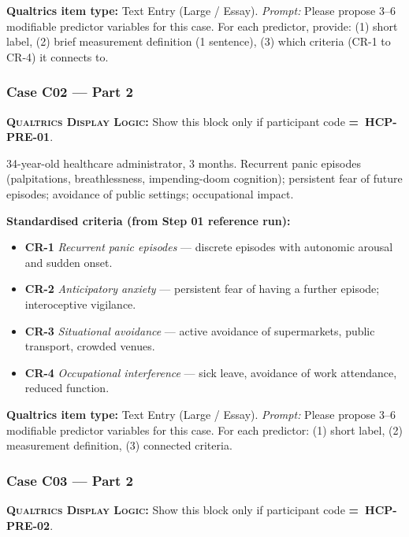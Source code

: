 \documentclass[11pt,a4paper]{article}
\newcommand{\responsetextarea}[1]{\begin{tcolorbox}[colback=ResponseBG,colframe=GoldAmber,boxrule=0.6pt,arc=1.5mm,left=6pt,right=6pt,top=5pt,bottom=5pt]\small\textbf{\color{GoldAmber}Qualtrics item type:} Text Entry (Large / Essay). \quad \textit{Prompt:} #1\end{tcolorbox}}
\newcommand{\dlnote}[1]{\par\vspace{0.15em}\noindent\begin{tcolorbox}[colback=AccentAmber,colframe=GoldAmber,boxrule=0.45pt,arc=1mm,left=5pt,right=5pt,top=2.5pt,bottom=2.5pt]\footnotesize\textbf{\color{GoldAmber}\scshape Qualtrics Display Logic:} Show this block only if participant code \textbf{=~#1}.\end{tcolorbox}\vspace{0.1em}}
\begin{document}
\responsetextarea{Please propose 3--6 modifiable predictor variables for this case. For each predictor, provide: (1) short label, (2) brief measurement definition (1 sentence), (3) which criteria (CR-1 to CR-4) it connects to.}

\vspace{0.4em}

\subsubsection*{Case C02 --- Part 2}
\dlnote{HCP-PRE-01}

\begin{complaintbox}[title=Case C02 --- Complaint (abbreviated)]
\small 34-year-old healthcare administrator, 3 months. Recurrent panic episodes (palpitations, breathlessness, impending-doom cognition); persistent fear of future episodes; avoidance of public settings; occupational impact.
\end{complaintbox}

\begin{contextbox}
\small\textbf{Standardised criteria (from Step 01 reference run):}
\begin{itemize}[topsep=2pt,itemsep=1pt]
\item \textbf{CR-1} \textit{Recurrent panic episodes} --- discrete episodes with autonomic arousal and sudden onset.
\item \textbf{CR-2} \textit{Anticipatory anxiety} --- persistent fear of having a further episode; interoceptive vigilance.
\item \textbf{CR-3} \textit{Situational avoidance} --- active avoidance of supermarkets, public transport, crowded venues.
\item \textbf{CR-4} \textit{Occupational interference} --- sick leave, avoidance of work attendance, reduced function.
\end{itemize}
\end{contextbox}

\responsetextarea{Please propose 3--6 modifiable predictor variables for this case. For each predictor: (1) short label, (2) measurement definition, (3) connected criteria.}

\vspace{0.4em}

\subsubsection*{Case C03 --- Part 2}
\dlnote{HCP-PRE-02}
\end{document}
